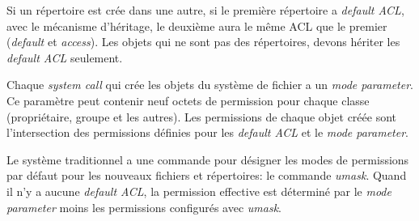 Si un répertoire est crée dans une autre, si le première répertoire a \emph{default ACL}, avec le mécanisme d'héritage, le deuxième aura le même ACL que le premier (\emph{default} et \emph{access}). Les objets qui ne sont pas des répertoires, devons hériter les \emph{default ACL} seulement.
 
Chaque \emph{system call} qui crée les objets du système de fichier a un \emph{mode parameter}. Ce paramètre peut contenir neuf octets de permission pour chaque classe (propriétaire, groupe et les autres). Les permissions de chaque objet créée sont l'intersection des permissions définies pour les \emph{default ACL} et le \emph{mode parameter}.
 
Le système traditionnel a une commande pour désigner les modes de permissions par défaut pour les nouveaux fichiers et répertoires: le commande \emph{umask}. Quand il n'y a aucune \emph{default ACL}, la permission effective est déterminé par le \emph{mode parameter} moins les permissions configurés avec \emph{umask}.
 
